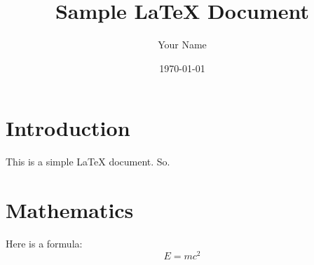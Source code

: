 \documentclass{article}
\begin{document}
\title{Sample LaTeX Document}
\author{Your Name}
\date{\today}
\maketitle

\section{Introduction}
This is a simple LaTeX document. So.

\section{Mathematics}
Here is a formula:
\[
E = mc^2
\]
\end{document}
